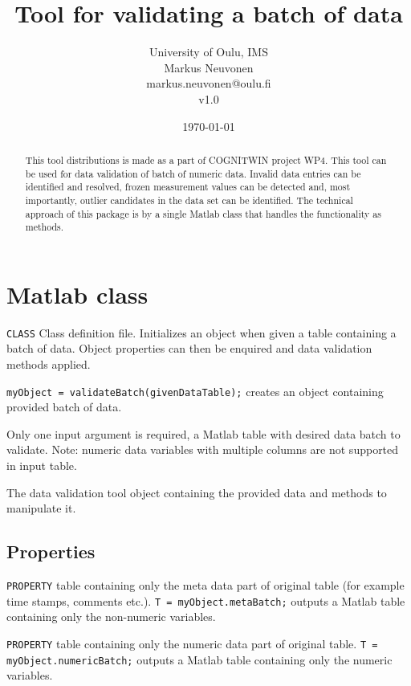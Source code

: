 \documentclass[twoside,a4paper]{refart}
\title{Tool for validating a batch of data}
\author{University of Oulu, IMS \\
Markus Neuvonen \\
markus.neuvonen@oulu.fi \\
v1.0\\
\date{\today}}
\begin{document}
\maketitle
\begin{abstract}
        This tool distributions is made as a part of COGNITWIN project WP4. This tool can be used for data validation of batch of numeric data. Invalid data entries can be identified and resolved, frozen measurement values can be detected and, most importantly, outlier candidates in the data set can be identified. The technical approach of this package is by a single Matlab class that handles the functionality as methods.
\end{abstract}



\section{Matlab class}
\verb|CLASS| Class definition file. Initializes an object when given a table containing a batch of data. Object properties can then be enquired and data validation methods applied.

\verb|myObject = validateBatch(givenDataTable);| creates an object containing provided batch of data.

 Only one input argument is required, a Matlab table with desired data batch to validate. Note: numeric data variables with multiple columns are not supported in input table.

 The data validation tool object containing the provided data and methods to manipulate it.

\subsection{Properties}
\verb|PROPERTY| table containing only the meta data part of original table (for example time stamps, comments etc.).
\verb|T = myObject.metaBatch;| outputs a Matlab table containing only the non-numeric variables.

\verb|PROPERTY| table containing only the numeric data part of original table.
\verb|T = myObject.numericBatch;| outputs a Matlab table containing only the numeric variables.
\end{document}
